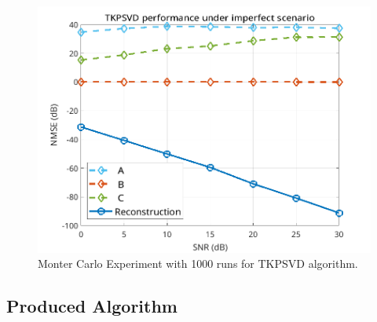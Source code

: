 \documentclass[a4paper,10pt]{article}
\begin{document}
    \begin{figure}[ht!]
        \centering 
        \includegraphics[width=0.85\linewidth]{figs/hw12.png} \par 
        \caption{Monter Carlo Experiment with 1000 runs for TKPSVD algorithm.}
        \label{fig:hw12} 
    \end{figure}

    \newpage
    \subsection*{Produced Algorithm}
\end{document}
